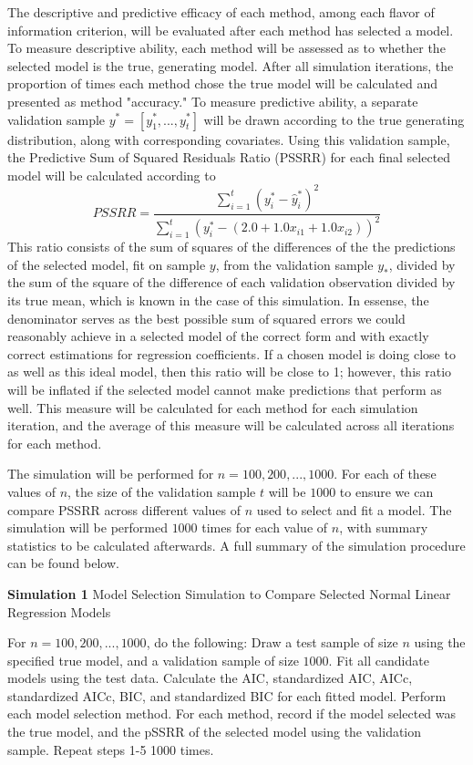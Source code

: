 		The descriptive and predictive efficacy of each method, among each flavor of information criterion, will be evaluated after each method has selected a model.
		To measure descriptive ability, each method will be assessed as to whether the selected model is the true, generating model. After all simulation iterations,
		the proportion of times each method chose the true model will be calculated and presented as method "accuracy." To measure predictive ability, a separate
		validation sample $y^* = [y^*_1,...,y^*_t]$ will be drawn according to the true generating distribution, along with corresponding covariates. Using this
		validation sample, the Predictive Sum of Squared Residuals Ratio (PSSRR) for each final selected model will be calculated according to
		\begin{equation}
			PSSRR = \frac{\sum_{i=1}^{t} (y^*_i - \hat{y}^*_i)^2}{\sum_{i=1}^{t} (y^*_i - (2.0 + 1.0x_{i1} + 1.0x_{i2}))^2}
		\end{equation}
		This ratio consists of the sum of squares of the differences of the the predictions of the selected model, fit on sample $y$, from the validation sample $y_*$,
		divided by the sum of the square of the difference of each validation observation divided by its true mean, which is known in the case of this simulation. In essense,
		the denominator serves as the best possible sum of squared errors we could reasonably achieve in a selected model of the correct form and with exactly correct estimations for regression
		coefficients. If a chosen model is doing close to as well as this ideal model, then this ratio will be close to 1; however, this ratio will be inflated if the selected model
		cannot make predictions that perform as well. This measure will be calculated for each method for each simulation iteration, and the average of this measure will be calculated
		across all iterations for each method.

		The simulation will be performed for $n = 100,200,...,1000$. For each of these values of $n$, the size of the validation sample $t$ will be
		$1000$ to ensure we can compare PSSRR across different values of $n$ used to select and fit a model. The simulation will be performed $1000$ times for each value of $n$,
		with summary statistics to be calculated afterwards. A full summary of the simulation procedure can be found below.
		\begin{algorithm}[H]
			\caption*{\textbf{Simulation 1} Model Selection Simulation to Compare Selected Normal Linear Regression Models}
			\begin{algorithmic}[1]
			  \Statex For $n = 100,200,...,1000$, do the following:
			  \State Draw a test sample of size $n$ using the specified true model, and a validation sample of size $1000$.
			  \State Fit all candidate models using the test data.
			  \State Calculate the AIC, standardized AIC, AICc, standardized AICc, BIC, and standardized BIC for each fitted model.
			  \State Perform each model selection method.
			  \State For each method, record if the model selected was the true model, and the pSSRR of the selected model using the validation sample.
			  \State Repeat steps 1-5 1000 times.
			\end{algorithmic}
		\end{algorithm}

